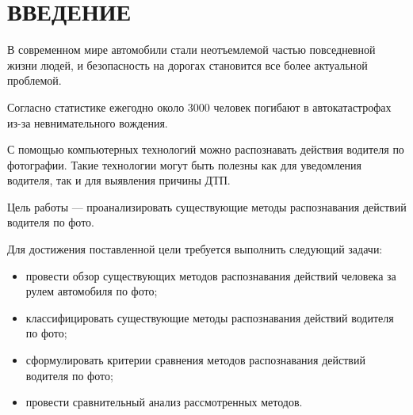 \section*{ВВЕДЕНИЕ}

В современном мире автомобили стали неотъемлемой частью повседневной жизни людей, и безопасность на дорогах становится все более актуальной проблемой.

Согласно статистике\cite{auto-acciden-stat} ежегодно около 3000 человек погибают в автокатастрофах из-за невнимательного вождения.

С помощью компьютерных технологий можно распознавать действия водителя по фотографии. Такие технологии могут быть полезны как для уведомления водителя, так и для выявления причины ДТП.

Цель работы --- проанализировать существующие методы распознавания действий водителя по фото.

Для достижения поставленной цели требуется выполнить следующий задачи:
\begin{itemize}[leftmargin=1.6\parindent, label*=---]
	\item провести обзор существующих методов распознавания действий человека за рулем автомобиля по фото;
	\item классифицировать существующие методы распознавания действий водителя по фото;
	\item сформулировать критерии сравнения методов распознавания действий водителя по фото;
	\item провести сравнительный анализ рассмотренных методов.
\end{itemize}

\pagebreak
